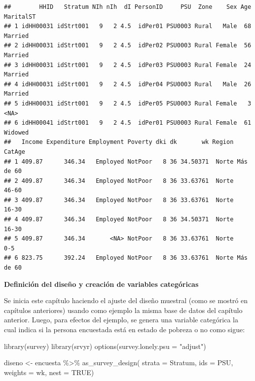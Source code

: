 \documentclass[
  12pt,
]{book}
\newenvironment{Shaded}{\begin{snugshade}}{\end{snugshade}}
\newcommand{\AttributeTok}[1]{\textcolor[rgb]{0.77,0.63,0.00}{#1}}
\newcommand{\ConstantTok}[1]{\textcolor[rgb]{0.00,0.00,0.00}{#1}}
\newcommand{\FunctionTok}[1]{\textcolor[rgb]{0.00,0.00,0.00}{#1}}
\newcommand{\NormalTok}[1]{#1}
\newcommand{\OtherTok}[1]{\textcolor[rgb]{0.56,0.35,0.01}{#1}}
\newcommand{\SpecialCharTok}[1]{\textcolor[rgb]{0.00,0.00,0.00}{#1}}
\newcommand{\StringTok}[1]{\textcolor[rgb]{0.31,0.60,0.02}{#1}}
\begin{document}
\begin{verbatim}
##        HHID   Stratum NIh nIh  dI PersonID     PSU  Zone    Sex Age MaritalST
## 1 idHH00031 idStrt001   9   2 4.5  idPer01 PSU0003 Rural   Male  68   Married
## 2 idHH00031 idStrt001   9   2 4.5  idPer02 PSU0003 Rural Female  56   Married
## 3 idHH00031 idStrt001   9   2 4.5  idPer03 PSU0003 Rural Female  24   Married
## 4 idHH00031 idStrt001   9   2 4.5  idPer04 PSU0003 Rural   Male  26   Married
## 5 idHH00031 idStrt001   9   2 4.5  idPer05 PSU0003 Rural Female   3      <NA>
## 6 idHH00041 idStrt001   9   2 4.5  idPer01 PSU0003 Rural Female  61   Widowed
##   Income Expenditure Employment Poverty dki dk       wk Region    CatAge
## 1 409.87      346.34   Employed NotPoor   8 36 34.50371  Norte Más de 60
## 2 409.87      346.34   Employed NotPoor   8 36 33.63761  Norte     46-60
## 3 409.87      346.34   Employed NotPoor   8 36 33.63761  Norte     16-30
## 4 409.87      346.34   Employed NotPoor   8 36 34.50371  Norte     16-30
## 5 409.87      346.34       <NA> NotPoor   8 36 33.63761  Norte       0-5
## 6 823.75      392.24   Employed NotPoor   8 36 33.63761  Norte Más de 60
\end{verbatim}

\textbf{Definición del diseño y creación de variables categóricas}

Se inicia este capítulo haciendo el ajuste del diseño muestral (como se mostró en capítulos anteriores) usando como ejemplo la misma base de datos del capítulo anterior. Luego, para efectos del ejemplo, se genera una variable categórica la cual indica si la persona encuestada está en estado de pobreza o no como sigue:

\begin{Shaded}
\begin{Highlighting}[]
\FunctionTok{library}\NormalTok{(survey)}
\FunctionTok{library}\NormalTok{(srvyr)}
\FunctionTok{options}\NormalTok{(}\AttributeTok{survey.lonely.psu =} \StringTok{"adjust"}\NormalTok{)}

\NormalTok{diseno }\OtherTok{\textless{}{-}}\NormalTok{ encuesta }\SpecialCharTok{\%\textgreater{}\%} 
          \FunctionTok{as\_survey\_design}\NormalTok{(}
                           \AttributeTok{strata =}\NormalTok{ Stratum,  }
                           \AttributeTok{ids =}\NormalTok{ PSU,         }
                           \AttributeTok{weights =}\NormalTok{ wk,      }
                           \AttributeTok{nest =} \ConstantTok{TRUE}\NormalTok{)}
\end{Highlighting}
\end{Shaded}
\end{document}
